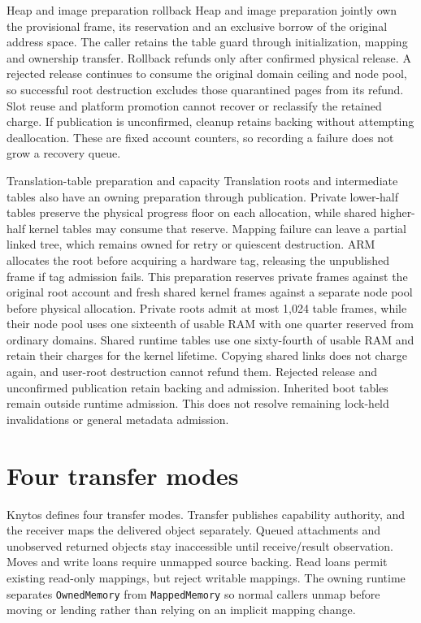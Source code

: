 \begin{implementationdetail}{Heap and image preparation rollback}
Heap and image preparation jointly own the provisional frame, its reservation
and an exclusive borrow of the original address space. The caller retains the
table guard through initialization, mapping and ownership transfer. Rollback
refunds only after confirmed physical release. A rejected release continues to
consume the original domain ceiling and node pool, so successful root destruction
excludes those quarantined pages from its refund. Slot reuse and platform
promotion cannot recover or reclassify the retained charge. If publication is
unconfirmed, cleanup retains backing without attempting deallocation. These
are fixed account counters, so recording a failure does not grow a recovery queue.
\end{implementationdetail}

\begin{implementationdetail}{Translation-table preparation and capacity}
Translation roots and intermediate tables also have an owning preparation
through publication. Private lower-half tables preserve the physical progress
floor on each allocation, while shared higher-half kernel tables may consume that
reserve. Mapping failure can leave a partial linked tree, which remains owned
for retry or quiescent destruction. ARM allocates the root before acquiring a
hardware tag, releasing the unpublished frame if tag admission fails. This
preparation reserves private frames against the original root account and fresh
shared kernel frames against a separate node pool before physical allocation.
Private roots admit at most 1,024 table frames, while their node pool uses one sixteenth
of usable RAM with one quarter reserved from ordinary domains. Shared runtime
tables use one sixty-fourth of usable RAM and retain their charges for the kernel
lifetime. Copying shared links does not charge again, and user-root destruction
cannot refund them. Rejected release and unconfirmed publication retain backing
and admission. Inherited boot tables remain outside runtime admission. This
does not resolve remaining lock-held invalidations or general metadata admission.
\end{implementationdetail}

\section{Four transfer modes}

Knytos defines four transfer modes. Transfer publishes capability authority, and
the receiver maps the delivered object separately. Queued attachments and
unobserved returned objects stay inaccessible until receive/result observation.
Moves and write loans require unmapped source backing. Read loans permit existing
read-only mappings, but reject writable mappings. The owning runtime separates
\texttt{OwnedMemory} from \texttt{MappedMemory} so normal callers unmap before
moving or lending rather than relying on an implicit mapping change.

